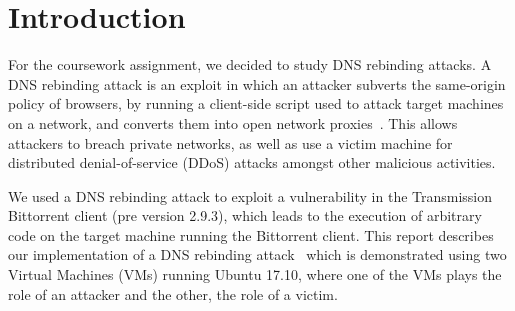 \chapter{Introduction}

For the coursework assignment, we decided to study DNS rebinding attacks.
A DNS rebinding attack is an exploit in which an attacker subverts
the same-origin policy of browsers, by running a client-side script used to
attack target machines on a network, and converts them into open network
proxies~\cite{jackson2009protecting}. This allows attackers to
breach private networks, as well as use a victim machine for distributed
denial-of-service (DDoS) attacks amongst other malicious activities.

\vspace{0.5cm}

We used a DNS rebinding attack to exploit a vulnerability in the Transmission
Bittorrent client (pre version 2.9.3), which leads to the execution of arbitrary
code on the target machine running the Bittorrent client. This report describes
our implementation of a DNS rebinding attack~\cite{cve20185702} which is
demonstrated using two Virtual Machines (VMs) running Ubuntu 17.10, where one of
the VMs plays the role of an attacker and the other, the role of a victim.
